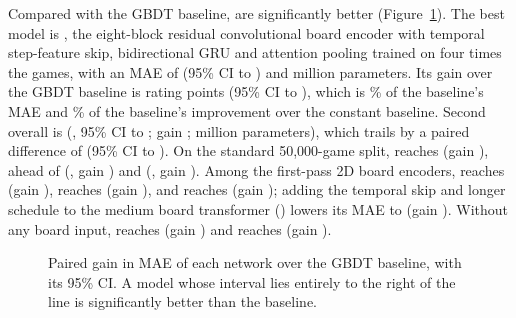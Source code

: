 \documentclass[11pt]{article}
\begin{document}
Compared with the GBDT baseline,  are significantly
better (Figure~\ref{fig:gains}). The best model is , the
eight-block residual convolutional board encoder with temporal step-feature
skip, bidirectional GRU and attention pooling trained on four times the games,
with an MAE of  (95\% CI  to
) and  million parameters. Its
gain over the GBDT baseline is  rating points (95\% CI
 to ), which is \% of
the baseline's MAE and \% of the baseline's improvement
over the constant baseline. Second overall is 
(, 95\% CI
 to
; gain
; 
million parameters), which trails  by a paired difference of
 (95\% CI
 to
). On the
standard 50{,}000-game split,  reaches
 (gain ), ahead of
 (, gain )
and  (, gain
). Among the first-pass 2D board encoders,
 reaches  (gain
),  reaches
 (gain ), and
 reaches  (gain
); adding the temporal skip and longer schedule
to the medium board transformer () lowers its MAE
to  (gain
). Without any board input,
 reaches  (gain
) and  reaches
 (gain ).

\begin{figure}[htbp]\centering
{}
\caption{Paired gain in MAE of each network over the GBDT baseline, with its
95\% CI. A model whose interval lies entirely to the right of the line is
significantly better than the baseline.}
\label{fig:gains}
\end{figure}
\end{document}
